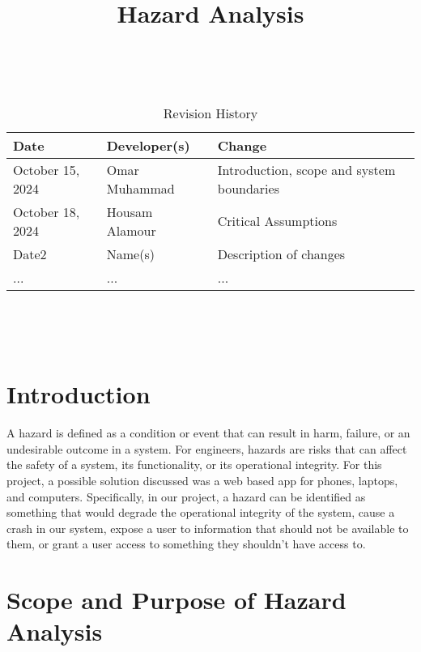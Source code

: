 \documentclass{article}
\title{Hazard Analysis\\\progname}
\author{\authname}
\date{}
\begin{document}
\maketitle
\thispagestyle{empty}

~\newpage


\begin{table}[hp]
\caption{Revision History} \label{TblRevisionHistory}
\begin{tabularx}{\textwidth}{llX}
\toprule
\textbf{Date} & \textbf{Developer(s)} & \textbf{Change}\\
\midrule
October 15, 2024 & Omar Muhammad & Introduction, scope and system boundaries\\
October 18, 2024 & Housam Alamour & Critical Assumptions\\
Date2 & Name(s) & Description of changes\\
... & ... & ...\\
\bottomrule
\end{tabularx}
\end{table}

~\newpage

\tableofcontents

~\newpage



\section{Introduction}

A hazard is defined as a condition or event that can result in harm, failure, or an undesirable outcome in a system. For engineers, hazards are risks that can affect the safety of a system, its functionality, or its operational integrity. For this project, a possible solution discussed was a web based app for phones, laptops, and computers. Specifically, in our project, a hazard can be identified as something that would degrade the operational integrity of the system, cause a crash in our system, expose a user to information that should not be available to them, or grant a user access to something they shouldn't have access to.

\section{Scope and Purpose of Hazard Analysis}
\end{document}
